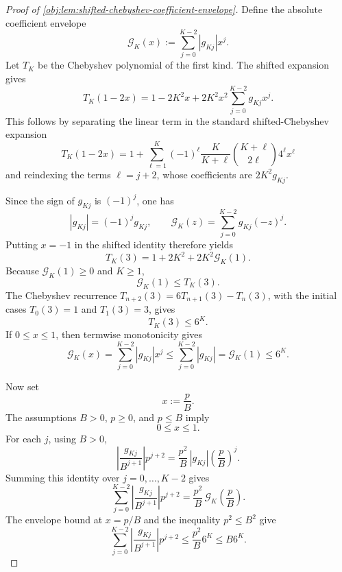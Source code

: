 \begin{proof}[Proof of \cref{obj:lem:shifted-chebyshev-coefficient-envelope}]
Define the absolute coefficient envelope
\[
\mathcal G_K(x)
:=
\sum_{j=0}^{K-2}|g_{Kj}|x^j .
\]
Let \(T_K\) be the Chebyshev polynomial of the first kind. The shifted expansion gives
\[
T_K(1-2x)
=
1-2K^2x
+
2K^2x^2
\sum_{j=0}^{K-2} g_{Kj}x^j .
\] %
This follows by separating the linear term in the standard shifted-Chebyshev expansion
\[
T_K(1-2x)
=
1+
\sum_{\ell=1}^{K}
(-1)^\ell
\frac{K}{K+\ell}
\binom{K+\ell}{2\ell}
4^\ell x^\ell
\]
and reindexing the terms \(\ell=j+2\), whose coefficients are \(2K^2g_{Kj}\). %

Since the sign of \(g_{Kj}\) is \((-1)^j\), one has
\[
|g_{Kj}|=(-1)^jg_{Kj},
\qquad
\mathcal G_K(z)=\sum_{j=0}^{K-2}g_{Kj}(-z)^j .
\] %
Putting \(x=-1\) in the shifted identity therefore yields
\[
T_K(3)=1+2K^2+2K^2\mathcal G_K(1).
\] %
Because \(\mathcal G_K(1)\ge0\) and \(K\ge1\),
\[
\mathcal G_K(1)\le T_K(3).
\] %
The Chebyshev recurrence \(T_{n+2}(3)=6T_{n+1}(3)-T_n(3)\), with the initial cases
\(T_0(3)=1\) and \(T_1(3)=3\), gives
\[
T_K(3)\le 6^K .
\] %
If \(0\le x\le1\), then termwise monotonicity gives
\[
\mathcal G_K(x)
=
\sum_{j=0}^{K-2}|g_{Kj}|x^j
\le
\sum_{j=0}^{K-2}|g_{Kj}|
=
\mathcal G_K(1)
\le 6^K .
\] %

Now set
\[
x:=\frac pB .
\]
The assumptions \(B>0\), \(p\ge0\), and \(p\le B\) imply
\[
0\le x\le1 .
\] %
For each \(j\), using \(B>0\),
\[
\left|\frac{g_{Kj}}{B^{j+1}}\right|p^{j+2}
=
\frac{p^2}{B}\,|g_{Kj}|
\left(\frac pB\right)^j .
\]
Summing this identity over \(j=0,\ldots,K-2\) gives
\[
\sum_{j=0}^{K-2}
\left|\frac{g_{Kj}}{B^{j+1}}\right|p^{j+2}
=
\frac{p^2}{B}\,
\mathcal G_K\!\left(\frac pB\right).
\]
The envelope bound at \(x=p/B\) and the inequality \(p^2\le B^2\) give
\[
\sum_{j=0}^{K-2}
\left|\frac{g_{Kj}}{B^{j+1}}\right|p^{j+2}
\le
\frac{p^2}{B}6^K
\le
B6^K .
\]
\end{proof}
